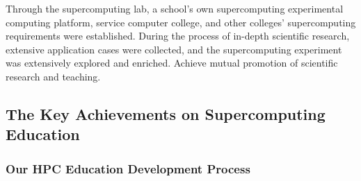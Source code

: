 \documentclass{mcmthesis}
\begin{document}
\par Through the supercomputing lab, a school's own supercomputing experimental computing platform, service computer college, and other colleges' supercomputing requirements were established. During the process of in-depth scientific research, extensive application cases were collected, and the supercomputing experiment was extensively explored and enriched. Achieve mutual promotion of scientific research and teaching.


\subsection{The Key Achievements on Supercomputing Education}

\subsubsection{Our HPC Education Development Process}
\end{document}
